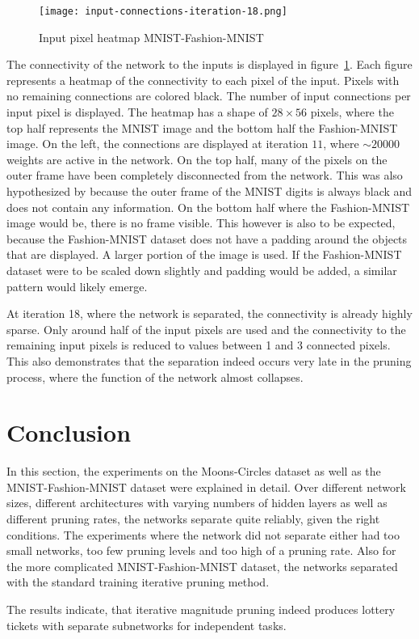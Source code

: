 \begin{figure}[ht]
    \centering
    \texttt{[image: input-connections-iteration-18.png]}
    \caption{
        Input pixel heatmap MNIST-Fashion-MNIST
    }\label{fig:input-heatmap}
\end{figure}

The connectivity of the network to the inputs is displayed in figure~\ref{fig:input-heatmap}.
Each figure represents a heatmap of the connectivity to each pixel of the input.
Pixels with no remaining connections are colored black.
The number of input connections per input pixel is displayed.
The heatmap has a shape of $28\times56$ pixels, where the top half represents the MNIST image and the bottom half the Fashion-MNIST image.
On the left, the connections are displayed at iteration $11$, where $\sim20000$ weights are active in the network.
On the top half, many of the pixels on the outer frame have been completely disconnected from the network.
This was also hypothesized by \textcite{LTH} because the outer frame of the MNIST digits is always black and does not contain any information.
On the bottom half where the Fashion-MNIST image would be, there is no frame visible.
This however is also to be expected, because the Fashion-MNIST dataset does not have a padding around the objects that are displayed. 
A larger portion of the image is used.
If the Fashion-MNIST dataset were to be scaled down slightly and padding would be added, a similar pattern would likely emerge.

At iteration 18, where the network is separated, the connectivity is already highly sparse.
Only around half of the input pixels are used and the connectivity to the remaining input pixels is reduced to values between 1 and 3 connected pixels.
This also demonstrates that the separation indeed occurs very late in the pruning process, where the function of the network almost collapses.

\section{Conclusion}
In this section, the experiments on the Moons-Circles dataset as well as the MNIST-Fashion-MNIST dataset were explained in detail.
Over different network sizes, different architectures with varying numbers of hidden layers as well as different pruning rates, the networks separate quite reliably, given the right conditions.
The experiments where the network did not separate either had too small networks, too few pruning levels and too high of a pruning rate.
Also for the more complicated MNIST-Fashion-MNIST dataset, the networks separated with the standard training iterative pruning method.

The results indicate, that iterative magnitude pruning indeed produces lottery tickets with separate subnetworks for independent tasks.
